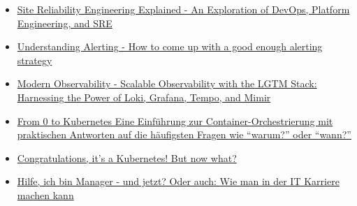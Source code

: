 \begin{itemize}
  \item \href{https://media.ccc.de/v/gpn21-48-site-reliability-engineering-explained-an-exploration-of-devops-platform-engineering-and-sre}{Site Reliability Engineering Explained - An Exploration of DevOps, Platform Engineering, and SRE}
  \item \href{https://media.ccc.de/v/gpn20-22-understanding-alerting-how-to-come-up-with-a-good-enough-alerting-strategy}{Understanding Alerting - How to come up with a good enough alerting strategy}
  \item \href{https://media.ccc.de/v/gpn21-47-modern-observability-scalable-observability-with-the-lgtm-stack-harnessing-the-power-of-loki-grafana-tempo-and-mimir}{Modern Observability - Scalable Observability with the LGTM Stack: Harnessing the Power of Loki, Grafana, Tempo, and Mimir}
  \item \href{https://media.ccc.de/v/gpn21-49-from-0-to-kubernetes-eine-einfhrung-zur-container-orchestrierung-mit-praktischen-antworten-auf-die-hufigsten-fragen-wie-warum-oder-wann-}{From 0 to Kubernetes Eine Einführung zur Container-Orchestrierung mit praktischen Antworten auf die häufigsten Fragen wie ``warum?'' oder ``wann?''}
  \item \href{https://media.ccc.de/v/gpn22-393-congratulations-it-s-a-kubernetes-but-now-what-}{Congratulations, it's a Kubernetes! But now what?}
  \item \href{https://media.ccc.de/v/denog14-22895-hilfe-ich-bin-manager-und-jetzt-oder-auch-wie-man-in-der-it-karriere-machen-kann-}{Hilfe, ich bin Manager - und jetzt? Oder auch: Wie man in der IT Karriere machen kann}
\end{itemize}
